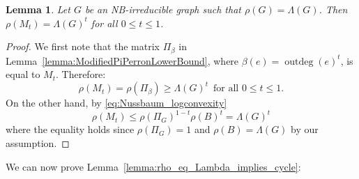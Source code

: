 \documentclass{article}
\newtheorem{lemma}[theorem]{Lemma}
\DeclareMathOperator{\outdeg}{outdeg}
\begin{document}
\begin{lemma}\label{lemma:Mt_eq_Lambda_t}
    Let $G$ be an NB-irreducible graph such that $\rho(G) = \Lambda(G)$. 
    Then  $\rho(M_t) = \Lambda(G)^t$ for all $0 \leq t \leq 1$.
\end{lemma}

\begin{proof}
    We first note that the matrix $\Pi_\beta$ in Lemma~\ref{lemma:ModifiedPiPerronLowerBound}, where $\beta(e)=\outdeg(e)^t$, is equal to $M_t$.
    Therefore:
    \begin{equation*}
        \rho(M_t) = \rho(\Pi_\beta) \geq \Lambda(G)^t \, \mbox{ for all }0 \leq t \leq 1.
    \end{equation*}
    On the other hand, by \eqref{eq:Nussbaum_logconvexity} 
    \begin{equation*}
        \rho(M_t) \leq \rho(\Pi_G)^{1-t}\rho(B)^t = \Lambda(G)^t
    \end{equation*}
    where the equality holds since $\rho(\Pi_G) =1$ and 
    $\rho(B) = \Lambda(G)$ by our assumption.
\end{proof}

\noindent
We can now prove Lemma~\ref{lemma:rho_eq_Lambda_implies_cycle}:
\end{document}
